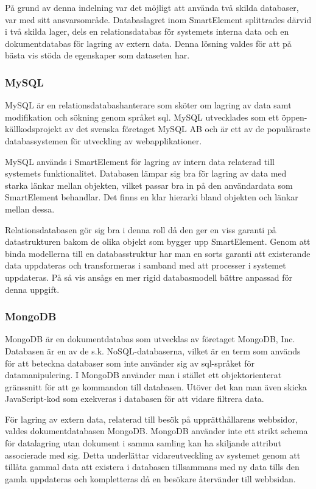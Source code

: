 På grund av denna indelning var det möjligt att använda två skilda databaser, var med sitt ansvarsområde. Databaslagret inom SmartElement splittrades därvid i två skilda lager, dels en relationsdatabas för systemets interna data och en dokumentdatabas för lagring av extern data. Denna lösning valdes för att på bästa vis stöda de egenskaper som dataseten har.

\subsubsection{MySQL}

MySQL är en relationsdatabashanterare som sköter om lagring av data samt modifikation och sökning genom språket \gls{sql}. MySQL utvecklades som ett öppen-källkodsprojekt av det svenska företaget MySQL AB och är ett av de populäraste databassystemen för utveckling av webapplikationer. \citep{dbengines}

MySQL används i SmartElement för lagring av intern data relaterad till systemets funktionalitet. Databasen lämpar sig bra för lagring av data med starka länkar mellan objekten, vilket passar bra in på den användardata som SmartElement behandlar. Det finns en klar hierarki bland objekten och länkar mellan dessa.

Relationsdatabasen gör sig bra i denna roll då den ger en viss garanti på datastrukturen bakom de olika objekt som bygger upp SmartElement. Genom att binda modellerna till en databasstruktur har man en sorts garanti att existerande data uppdateras och transformeras i samband med att processer i systemet uppdateras. På så vis ansågs en mer rigid databasmodell bättre anpassad för denna uppgift.

\subsubsection{MongoDB}

MongoDB är en dokumentdatabas som utvecklas av företaget MongoDB, Inc. Databasen är en av de s.k. NoSQL-databaserna, vilket är en term som används för att beteckna databaser som inte använder sig av \gls{sql}-språket för datamanipulering. I MongoDB använder man i stället ett objektorienterat gränssnitt för att ge kommandon till databasen. Utöver det kan man även skicka JavaScript-kod som exekveras i databasen för att vidare filtrera data. \citep{mongoquery}

För lagring av extern data, relaterad till besök på upprätthållarens webbsidor, valdes dokumentdatabasen MongoDB. MongoDB använder inte ett strikt schema för datalagring utan dokument i samma samling kan ha skiljande attribut associerade med sig. Detta underlättar vidareutveckling av systemet genom att tillåta gammal data att existera i databasen tillsammans med ny data tills den gamla uppdateras och kompletteras då en besökare återvänder till webbsidan.

